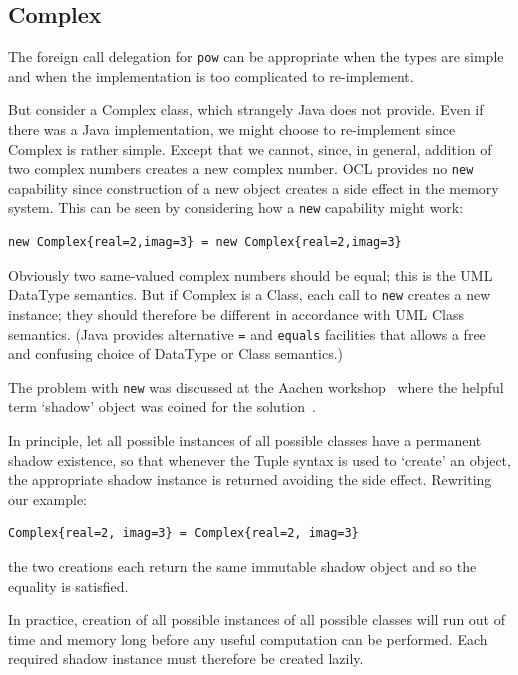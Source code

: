 \documentclass[sigconf]{acmart}
\begin{document}
\subsection{Complex}

The foreign call delegation for \verb|pow| can be appropriate when the types are simple and when the implementation is too complicated to re-implement.

But consider a Complex class, which strangely Java does not provide. Even if there was a Java implementation, we might choose to re-implement since Complex is rather simple. Except that we cannot, since, in general, addition of two complex numbers creates a new complex number. OCL provides no \verb|new| capability since construction of a new object creates a side effect in the memory system. This can be seen by considering how a \verb|new| capability might work:

\begin{verbatim}
new Complex{real=2,imag=3} = new Complex{real=2,imag=3}
\end{verbatim} 

Obviously two same-valued complex numbers should be equal; this is the UML DataType semantics. But if Complex is a Class, each call to \verb|new| creates a new instance; they should therefore be different in accordance with UML Class semantics. (Java provides alternative \verb|=| and \verb|equals| facilities that allows a free and confusing choice of DataType or Class semantics.)

The problem with \verb|new| was discussed at the Aachen workshop~\cite{OCL-Aachen} where the helpful term `shadow' object was coined for the solution~\cite{Willink-Shadow}.

In principle, let all possible instances of all possible classes have a permanent shadow existence, so that whenever the Tuple syntax is used to `create' an object, the appropriate shadow instance is returned avoiding the side effect. Rewriting our example:

\begin{verbatim}
Complex{real=2, imag=3} = Complex{real=2, imag=3}
\end{verbatim} 

the two creations each return the same immutable shadow object and so the equality is satisfied. 

In practice, creation of all possible instances of all possible classes will run out of time and memory long before any useful computation can be performed. Each required shadow instance must therefore be created lazily. 
\end{document}
